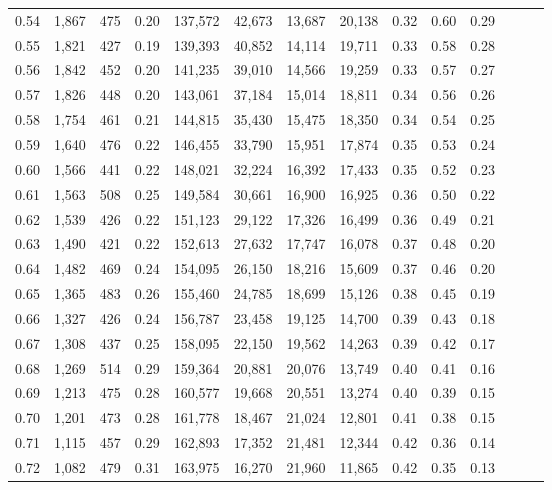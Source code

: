 \begin{tabular}{rrrrrrrrrrrrrr}
0.54 &  1,867 &    475 &  0.20 &  137,572 &   42,673 &  13,687 &  20,138 &  0.32 &  0.60 &      0.29 \\
0.55 &  1,821 &    427 &  0.19 &  139,393 &   40,852 &  14,114 &  19,711 &  0.33 &  0.58 &      0.28 \\
0.56 &  1,842 &    452 &  0.20 &  141,235 &   39,010 &  14,566 &  19,259 &  0.33 &  0.57 &      0.27 \\
0.57 &  1,826 &    448 &  0.20 &  143,061 &   37,184 &  15,014 &  18,811 &  0.34 &  0.56 &      0.26 \\
0.58 &  1,754 &    461 &  0.21 &  144,815 &   35,430 &  15,475 &  18,350 &  0.34 &  0.54 &      0.25 \\
0.59 &  1,640 &    476 &  0.22 &  146,455 &   33,790 &  15,951 &  17,874 &  0.35 &  0.53 &      0.24 \\
0.60 &  1,566 &    441 &  0.22 &  148,021 &   32,224 &  16,392 &  17,433 &  0.35 &  0.52 &      0.23 \\
0.61 &  1,563 &    508 &  0.25 &  149,584 &   30,661 &  16,900 &  16,925 &  0.36 &  0.50 &      0.22 \\
0.62 &  1,539 &    426 &  0.22 &  151,123 &   29,122 &  17,326 &  16,499 &  0.36 &  0.49 &      0.21 \\
0.63 &  1,490 &    421 &  0.22 &  152,613 &   27,632 &  17,747 &  16,078 &  0.37 &  0.48 &      0.20 \\
0.64 &  1,482 &    469 &  0.24 &  154,095 &   26,150 &  18,216 &  15,609 &  0.37 &  0.46 &      0.20 \\
0.65 &  1,365 &    483 &  0.26 &  155,460 &   24,785 &  18,699 &  15,126 &  0.38 &  0.45 &      0.19 \\
0.66 &  1,327 &    426 &  0.24 &  156,787 &   23,458 &  19,125 &  14,700 &  0.39 &  0.43 &      0.18 \\
0.67 &  1,308 &    437 &  0.25 &  158,095 &   22,150 &  19,562 &  14,263 &  0.39 &  0.42 &      0.17 \\
0.68 &  1,269 &    514 &  0.29 &  159,364 &   20,881 &  20,076 &  13,749 &  0.40 &  0.41 &      0.16 \\
0.69 &  1,213 &    475 &  0.28 &  160,577 &   19,668 &  20,551 &  13,274 &  0.40 &  0.39 &      0.15 \\
0.70 &  1,201 &    473 &  0.28 &  161,778 &   18,467 &  21,024 &  12,801 &  0.41 &  0.38 &      0.15 \\
0.71 &  1,115 &    457 &  0.29 &  162,893 &   17,352 &  21,481 &  12,344 &  0.42 &  0.36 &      0.14 \\
0.72 &  1,082 &    479 &  0.31 &  163,975 &   16,270 &  21,960 &  11,865 &  0.42 &  0.35 &      0.13 \\

\end{tabular}
